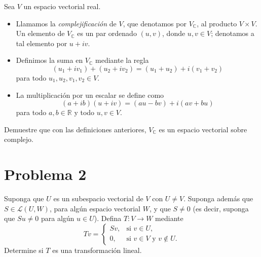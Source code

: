 \documentclass[11pt]{article}
\begin{document}
Sea \(V\) un espacio vectorial real.

\begin{itemize}
  \item Llamamos la \emph{complejificación} de \(V\), que denotamos por \(V_{\mathbb C}\), al producto \(V\times V\). Un elemento de \(V_{\mathbb C}\) es un par ordenado \((u,v)\), donde \(u,v\in V\); denotamos a tal elemento por \(u+iv\).
  \item Definimos la suma en \(V_{\mathbb C}\) mediante la regla
  \[
    (u_1+iv_1)+(u_2+iv_2)=(u_1+u_2)+i(v_1+v_2)
  \]
  para todo \(u_1,u_2,v_1,v_2\in V\).
  \item La multiplicación por un escalar se define como
  \[
    (a+ib)(u+iv)=(au-bv)+i(av+bu)
  \]
  para todo \(a,b\in\mathbb{R}\) y todo \(u,v\in V\).
\end{itemize}
Demuestre que con las definiciones anteriores, \(V_{\mathbb C}\) es un espacio vectorial sobre complejo.

\section*{Problema 2}
Suponga que \(U\) es un subespacio vectorial de \(V\) con \(U\neq V\). Suponga además que \(S\in\mathcal L(U,W)\), para algún espacio vectorial \(W\), y que \(S\neq 0\) (es decir, suponga que \(Su\neq 0\) para algún \(u\in U\)). Defina \(T:V\to W\) mediante
\[
  Tv=
  \begin{cases}
    Sv, & \text{si } v\in U,\\[4pt]
    0,  & \text{si } v\in V \text{ y } v\not\in U.
  \end{cases}
\]
Determine si \(T\) es una transformación lineal.
\end{document}
